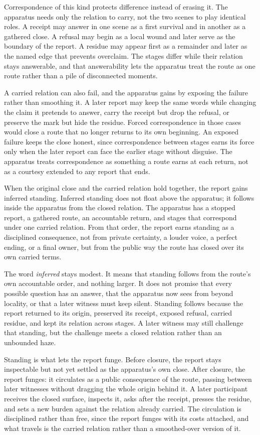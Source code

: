 Correspondence of this kind protects difference instead of erasing it. The
apparatus needs only the relation to carry, not the two scenes to play identical
roles. A receipt may answer in one scene as a first survival and in another as a
gathered close. A refusal may begin as a local wound and later serve as the
boundary of the report. A residue may appear first as a remainder and later as
the named edge that prevents overclaim. The stages differ while their relation
stays answerable, and that answerability lets the apparatus treat the route as
one route rather than a pile of disconnected moments.

A carried relation can also fail, and the apparatus gains by exposing the
failure rather than smoothing it. A later report may keep the same words while
changing the claim it pretends to answer, carry the receipt but drop the
refusal, or preserve the mark but hide the residue. Forced correspondence in
those cases would close a route that no longer returns to its own beginning. An
exposed failure keeps the close honest, since correspondence between stages
earns its force only when the later report can face the earlier stage without
disguise. The apparatus treats correspondence as something a route earns at each
return, not as a courtesy extended to any report that ends.

When the original close and the carried relation hold together, the report gains
inferred standing. Inferred standing does not float above the apparatus; it
follows inside the apparatus from the closed relation. The apparatus has a
stopped report, a gathered route, an accountable return, and stages that
correspond under one carried relation. From that order, the report earns
standing as a disciplined consequence, not from private certainty, a louder
voice, a perfect ending, or a final owner, but from the public way the route has
closed over its own carried terms.

The word \emph{inferred} stays modest. It means that standing follows from the
route's own accountable order, and nothing larger. It does not promise that
every possible question has an answer, that the apparatus now sees from beyond
locality, or that a later witness must keep silent. Standing follows because the
report returned to its origin, preserved its receipt, exposed refusal, carried
residue, and kept its relation across stages. A later witness may still challenge
that standing, but the challenge meets a closed relation rather than an unbounded
haze.

Standing is what lets the report funge. Before closure, the report stays
inspectable but not yet settled as the apparatus's own close. After closure, the
report funges: it circulates as a public consequence of the route, passing
between later witnesses without dragging the whole origin behind it. A later
participant receives the closed surface, inspects it, asks after the receipt,
presses the residue, and sets a new burden against the relation already carried.
The circulation is disciplined rather than free, since the report funges with its
costs attached, and what travels is the carried relation rather than a
smoothed-over version of it.

